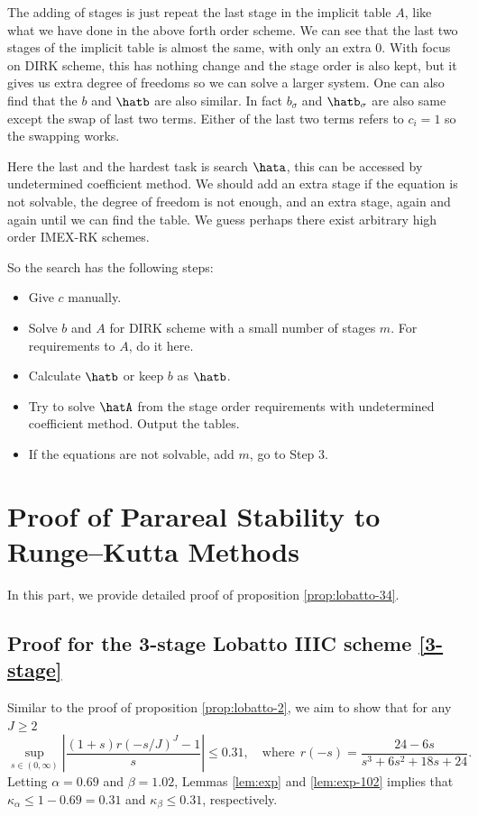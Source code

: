 The adding of stages is just repeat the last stage in the implicit table $A$, like what we have done in the above forth order scheme.
We can see that the last two stages of the implicit table is almost the same, with only an extra $0$.
With focus on DIRK scheme, this has nothing change and the stage order is also kept,
but it gives us extra degree of freedoms so we can solve a larger system.
One can also find that the $b$ and $\hatb$ are also similar.
In fact $b_\sigma$ and $\hatb_\sigma$ are also same except the swap of last two terms.
Either of the last two terms refers to $c_i=1$ so the swapping works.

Here the last and the hardest task is search $\hata$, this can be accessed by undetermined coefficient method.
We should add an extra stage if the equation is not solvable, the degree of freedom is not enough,
and an extra stage, again and again until we can find the table.
We guess perhaps there exist arbitrary high order IMEX-RK schemes.

So the search has the following steps:
\begin{itemize}
    \item[{\bf Step 1:}] Give $c$ manually.
    \item[{\bf Step 2:}] Solve $b$ and $A$ for DIRK scheme with a small number of stages $m$. For requirements to $A$, do it here.
    \item[{\bf Step 3:}] Calculate $\hatb$ or keep $b$ as $\hatb$.
    \item[{\bf Step 4:}] Try to solve $\hatA$ from the stage order requirements with undetermined coefficient method. Output the tables.
    \item[{\bf Step 5:}] If the equations are not solvable, add $m$, go to Step 3.
\end{itemize}




\section{Proof of Parareal Stability to Runge--Kutta Methods}
In this part, we provide detailed proof of proposition \ref{prop:lobatto-34}.

\subsection*{Proof for the 3-stage Lobatto IIIC scheme \eqref{3-stage}}
Similar to the proof of proposition \ref{prop:lobatto-2}, we aim to show that for any $J\ge 2$
\begin{equation}\label{eqn:lobatto-3}
    \sup_{s\in(0,\infty)}  \left|\frac{(1+s) r(-s/J)^J-1}{s}\right| \le 0.31,
    \quad
    \text{where}~~ r(-s) = \frac{24-6s}{s^3 + 6s^2 + 18s + 24}.
\end{equation}
Letting $\alpha = 0.69$ and $\beta=1.02$,
Lemmas \ref{lem:exp} and \ref{lem:exp-102} implies that
$\kappa_\alpha \le 1-0.69 = 0.31$ and $\kappa_\beta \le 0.31$, respectively.

